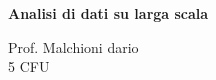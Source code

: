 \documentclass[\main/main.tex]{subfiles}
\begin{document}
\begin{titlepage}
    \begin{center}
        \vspace*{1em}
        
        \textbf{\large{Analisi di dati su larga scala}}
        
        \vspace{1em}
        Prof. Malchioni dario
        \\
        \small{5 CFU}
        \vspace{1em}
        
		 
        
    \end{center}
\end{titlepage}
\end{document}
